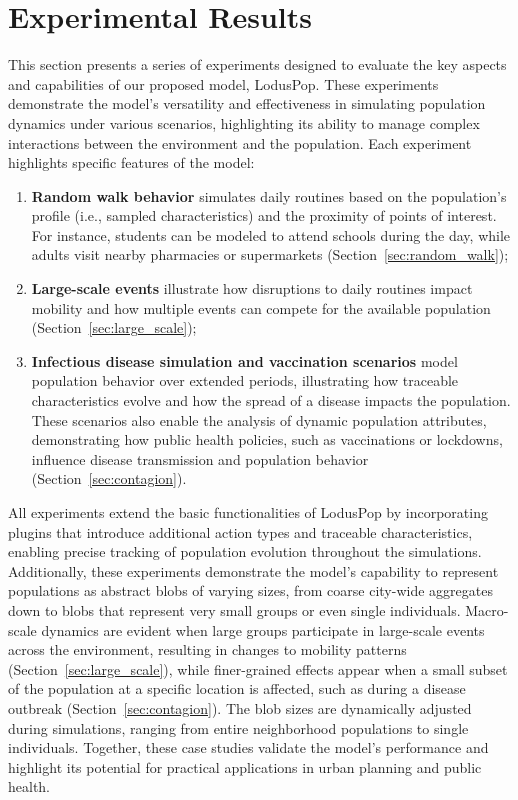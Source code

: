 \chapter{Experimental Results}
\label{chapter:results}

This section presents a series of experiments designed to evaluate the key aspects and capabilities of our proposed model, LodusPop. These experiments demonstrate the model's versatility and effectiveness in simulating population dynamics under various scenarios, highlighting its ability to manage complex interactions between the environment and the population. Each experiment highlights specific features of the model:
\begin{enumerate}
    \item \textbf{Random walk behavior} simulates daily routines based on the population's profile (i.e., sampled characteristics) and the proximity of points of interest. For instance, students can be modeled to attend schools during the day, while adults visit nearby pharmacies or supermarkets (Section~\ref{sec:random_walk});
    \item \textbf{Large-scale events} illustrate how disruptions to daily routines impact mobility and how multiple events can compete for the available population  (Section~\ref{sec:large_scale});
    \item \textbf{Infectious disease simulation and vaccination scenarios} model population behavior over extended periods, illustrating how traceable characteristics evolve and how the spread of a disease impacts the population. These scenarios also enable the analysis of dynamic population attributes, demonstrating how public health policies, such as vaccinations or lockdowns, influence disease transmission and population behavior (Section~\ref{sec:contagion}).
\end{enumerate}

All experiments extend the basic functionalities of LodusPop by incorporating plugins that introduce additional action types and traceable characteristics, enabling precise tracking of population evolution throughout the simulations.
Additionally, these experiments demonstrate the model’s capability to represent populations as abstract blobs of varying sizes, from coarse city-wide aggregates down to blobs that represent very small groups or even single individuals. Macro-scale dynamics are evident when large groups participate in large-scale events across the environment, resulting in changes to mobility patterns (Section~\ref{sec:large_scale}), while finer-grained effects appear when a small subset of the population at a specific location is affected, such as during a disease outbreak (Section~\ref{sec:contagion}).
The blob sizes are dynamically adjusted during simulations, ranging from entire neighborhood populations to single individuals. 
Together, these case studies validate the model’s performance and highlight its potential for practical applications in urban planning and public health.

